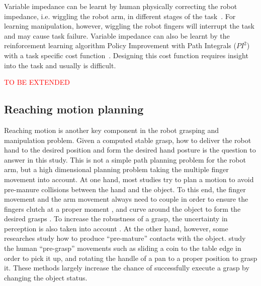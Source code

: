 Variable impedance can be learnt by human physically correcting the robot impedance, i.e. wiggling the robot arm, in different stages of the task~\citep{kronander2012online}. For learning manipulation, however, wiggling the robot fingers will interrupt the task and may cause task failure.
Variable impedance can also be learnt by the reinforcement learning algorithm Policy Improvement with Path Integrals ($PI^2$) with a task specific cost function~\citep{buchli2011learning}. Designing this cost function requires insight into the task and usually is difficult.

\textcolor{red}{TO BE EXTENDED}

\subsection{Reaching motion planning}
\label{cha2:sec1:grasping:reaching}

Reaching motion is another key component in the robot grasping and manipulation problem. Given a computed stable grasp, how to deliver the robot hand to the desired position and form the desired hand posture is the question to answer in this study. This is not a simple path planning problem for the robot arm, but a high dimensional planning problem taking the multiple finger movement into account. At one hand, most studies try to plan a motion to avoid pre-manure collisions between the hand and the object. To this end, the finger movement and the arm movement always need to couple in order to ensure the fingers clutch at a proper moment \citep{Shukla2011CDS}, and curve around the object to form the desired grasps \citep{kroemer2011grasping}. To increase the robustness of a grasp, the uncertainty in perception is also taken into account \citep{stulp2011learning}. At the other hand, however, some researches study how to produce ``pre-mature'' contacts with the object.
\citet{chang2010planning} study the human ``pre-grasp'' movements such as sliding a coin to the table edge in order to pick it up, and rotating the handle of a pan to a proper position to grasp it. These methods largely increase the chance of successfully execute a grasp by changing the object status.
